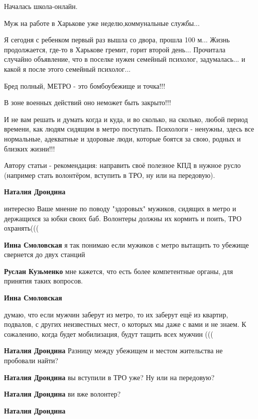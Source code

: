 \begin{itemize}
Началась школа-онлайн.

Муж на работе в Харькове уже неделю,коммунальные службы...

Я сегодня с ребенком первый раз вышла со двора, прошла 100 м... Жизнь
продолжается, где-то в Харькове гремит, горит второй день...  Прочитала
случайно объявление, что в поселке нужен семейный психолог, задумалась... и
какой я после этого семейный психолог...


Бред полный, МЕТРО - это бомбоубежище и точка!!!

В зоне военных действий оно неможет быть закрыто!!!

И не вам решать и думать когда и куда, и во сколько, на сколько, любой период
времени, как людям сидящим в метро поступать. Психологи - ненужны, здесь все
нормальные, адекватные и здоровые люди, которые боятся за свою, родных и
близких жизни!!!

Автору статьи - рекомендация: направить своё полезное КПД в нужное русло
(например стать волонтёром, вступить в ТРО, ну или на передовую).

\begin{itemize} %
\textbf{Наталия Дрондина} 

интересно Ваше мнение по поводу "здоровых" мужиков, сидящих в метро и держащихся
за юбки своих баб. Волонтеры должны их кормить и поить, ТРО охранять(((

\textbf{Инна Смоловская} я так понимаю если мужиков с метро вытащить то убежище свернется до двух станций

\textbf{Руслан Кузьменко} мне кажется, что есть более компетентные органы, для принятия таких вопросов.

\textbf{Инна Смоловская} 

думаю, что если мужчин заберут из метро, то их заберут ещё из квартир,
подвалов, с других неизвестных мест, о которых мы даже с вами и не знаем. К
сожалению, когда будет мобилизация, будут тащить всех мужчин (((

\textbf{Наталия Дрондина} Разницу между убежищем и местом жительства не пробовали найти?

\textbf{Наталия Дрондина} вы вступили в ТРО уже? Ну или на передовую?

\textbf{Наталия Дрондина} ви вже волонтер?

\textbf{Наталия Дрондина} 


\end{itemize}
\end{itemize}
